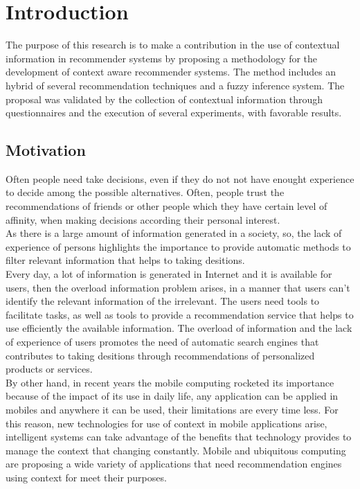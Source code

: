 \chapter{Introduction} \label{introduction} 

The purpose of this research is to make a contribution in the 
use of contextual information in recommender systems by proposing a methodology for
the development of context aware recommender systems.
The method includes an hybrid of several recommendation techniques and a
fuzzy inference system. The proposal was validated by 
the collection of contextual
information through questionnaires and the execution of several experiments,
with favorable results.

\section{Motivation}

Often people need take decisions, even if they do not
not have enought experience to decide among the possible alternatives. Often,
people trust the recommendations of friends or other people which they  
have certain level of affinity, when making decisions
according their personal interest.\\
As there is a large amount of information generated in a society, so, the
lack of experience of persons highlights the importance to provide
automatic methods to filter relevant information that helps to taking
desitions. \\Every day, a lot of information is generated in Internet
and it is available for users, then the overload information problem
arises, in a manner that users can't identify the relevant information
of the irrelevant. The users need tools to facilitate tasks, as well
as tools to provide a recommendation service that helps to use
efficiently the available information. The overload of information and
the lack of experience of users promotes the need of automatic search
engines that contributes to taking desitions through recommendations
of personalized products or services. \\ By other hand, in recent
years the mobile computing rocketed its importance because of the
impact of its use in daily life, any application can be applied in
mobiles and anywhere it can be used, their limitations are every time
less. For this reason, new technologies for use of context in mobile
applications arise, intelligent systems can take advantage of the
benefits that technology provides to manage the context that changing
constantly. Mobile and ubiquitous computing\cite{noguera2012mobile}
\cite{chiou2010adaptive} are proposing a wide variety of applications
that need recommendation engines using context for meet their
purposes.

